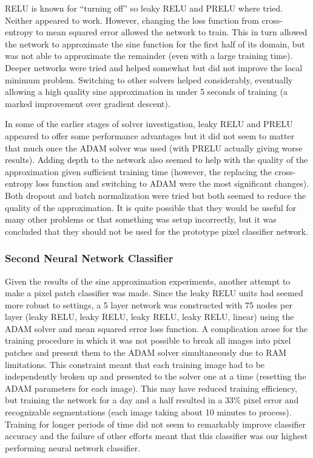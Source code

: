 \documentclass[12pt]{article}
\begin{document}
	RELU is known for “turning off” so leaky RELU and PRELU where tried.  Neither appeared to work.  However, changing the loss function from cross-entropy to mean squared error allowed the network to train.  This in turn allowed the network to approximate the sine function for the first half of its domain, but was not able to approximate the remainder (even with a large training time).  Deeper networks were tried and helped somewhat but did not improve the local minimum problem.  Switching to other solvers helped considerably, eventually allowing a high quality sine approximation in under 5 seconds of training (a marked improvement over gradient descent).

	In some of the earlier stages of solver investigation, leaky RELU and PRELU appeared to offer some performance advantages but it did not seem to matter that much once the ADAM solver was used (with PRELU actually giving worse results).  Adding depth to the network also seemed to help with the quality of the approximation given sufficient training time (however, the replacing the cross-entropy loss function and switching to ADAM were the most significant changes).  Both dropout and batch normalization were tried but both seemed to reduce the quality of the approximation.  It is quite possible that they would be useful for many other problems or that something was setup incorrectly, but it was concluded that they should not be used for the prototype pixel classifier network.

\subsubsection{Second Neural Network Classifier}

	Given the results of the sine approximation experiments, another attempt to make a pixel patch classifier was made.  Since the leaky RELU units had seemed more robust to settings, a 5 layer network was constructed with 75 nodes per layer (leaky RELU,  leaky RELU,  leaky RELU,  leaky RELU, linear) using the ADAM solver and mean squared error loss function.  A complication arose for the training procedure in which it was not possible to break all images into pixel patches and present them to the ADAM solver simultaneously due to RAM limitations.  This constraint meant that each training image had to be independently broken up and presented to the solver one at a time (resetting the ADAM parameters for each image).  This may have reduced training efficiency, but training the network for a day and a half resulted in a 33\% pixel error and recognizable segmentations (each image taking about 10 minutes to process).  Training for longer periods of time did not seem to remarkably improve classifier accuracy and the failure of other efforts meant that this classifier was our highest performing neural network classifier.
\end{document}
